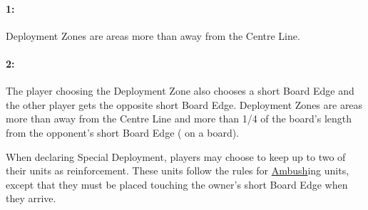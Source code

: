 \begin{minipage}{0.67\textwidth}
\idx[main=y]{\frontlineclash}\hypertarget{frontline_clash}{\paragraph{1\spacebeforecolon{}: \frontlineclash}}
\label{figure/deployment}
\vspace*{0.5ex}

Deployment Zones are areas more than  away from the Centre Line.
\end{minipage}\hfill\begin{minipage}{0.275\textwidth}
\def\svgwidth{\textwidth}

\end{minipage}\hspace*{0.022\textwidth}

\begin{minipage}{0.67\textwidth}
\idx[main=y]{\dawnassault}\hypertarget{dawn_assault}{\paragraph{2\spacebeforecolon{}: \dawnassault}}
\vspace*{0.5ex}

The player choosing the Deployment Zone also chooses a short Board Edge  and the other player gets the opposite short Board Edge. Deployment Zones are areas more than  away from the Centre Line and more than 1/4 of the board's length from the opponent's short Board Edge ( on a  board).

When declaring Special Deployment, players may choose to keep up to two of their units as reinforcement. These units follow the rules for \hyperref[ambush]{Ambush}ing units, except that they must be placed touching the owner's short Board Edge when they arrive.
\end{minipage}\hfill\begin{minipage}{0.32\textwidth}
\def\svgwidth{\textwidth}

\end{minipage}

